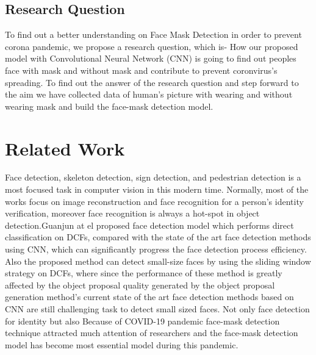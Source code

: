 \documentclass[conference]{IEEEtran}
\begin{document}
\subsection{Research Question}
To  find  out  a  better  understanding  on  Face Mask Detection in order to prevent corona pandemic,  we  propose  a  research  question,  which  is- How our proposed model with Convolutional Neural Network (CNN) is going to find out peoples face with mask and without mask and contribute to prevent coronvirus's spreading. 
To   find   out   the   answer   of   the   research   question   and step  forward  to  the  aim  we  have  collected  data of human's picture with wearing and without wearing mask and build the face-mask detection model.

\section{Related Work}
Face detection, skeleton detection, sign detection, and pedestrian detection is a most focused task in computer vision in this modern time\cite{benenson2014ten}\cite{fu2010survey}. Normally, most of the works focus on image reconstruction and face recognition for a person's identity verification, moreover face recognition is always a hot-spot in object detection\cite{yadav2020deep}.Guanjun at el \cite{A1} proposed face detection model which performs direct classification on DCFs, compared with the state of the art face detection methods using CNN, which can significantly progress the face detection process efficiency. Also the proposed method can detect small-size faces by using the sliding window strategy on DCFs, where since the performance of these method is greatly affected  by the object proposal quality generated by the object proposal generation method's current state of the art face detection methods based on CNN are still challenging task to detect small sized faces\cite{A1}. Not only face detection for identity but also Because of COVID-19 pandemic face-mask detection technique attracted much attention of researchers and the face-mask detection model has become most essential model during this pandemic\cite{jiang2021real}. \\
\end{document}
